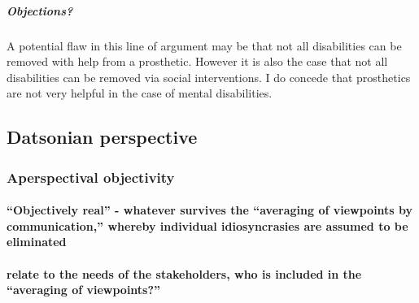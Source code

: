 \documentclass[a4paper]{article}
\begin{document}
\subparagraph{Objections?}

A potential flaw in this line of argument may be that not all disabilities can
be removed with help from a prosthetic. However it is also the case that not
all disabilities can be removed via social interventions. I do concede that
prosthetics are not very helpful in the case of mental disabilities. 


\subsection{Datsonian perspective}

\subsubsection{Aperspectival objectivity}

\paragraph{``Objectively real'' - whatever survives the ``averaging of viewpoints
by communication,'' whereby individual idiosyncrasies are assumed to be
eliminated}

\paragraph{relate to the needs of the stakeholders, who is included in the
``averaging of viewpoints?''}




\cleardoublepage


%
%

\end{document}
